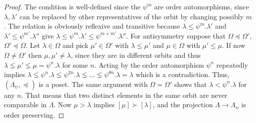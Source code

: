 \documentclass[a4paper,11pt]{amsart}
\numberwithin{equation}{subsection}
\theoremstyle{definition}
\theoremstyle{theorem}
\theoremstyle{remark}
\begin{document}
\begin{proof}
The condition is well-defined since the $\psi^{m}$ are order automorphisms, since
$\lambda,\lambda'$ can be replaced by other representatives of the orbit by changing possibly $m$.
 The relation is obviously reflexive and transitive because
$\lambda\le\psi^{m}.\lambda'$ and $\lambda'\le\psi^{m'}.\lambda''$ give
$\lambda\le\psi^{m}.\lambda'\le\psi^{m+m'}.\lambda''$. For antisymmetry suppose that $\Omega\preceq\Omega'$, $\Omega'\preceq\Omega$. Let $\lambda\in\Omega$ and pick $\mu'\in\Omega'$
with $\lambda\le\mu'$ and $\mu\in\Omega$ with $\mu'\le\mu$. If now $\Omega\ne\Omega'$ then $\mu,\mu'\not=\lambda$, since they are in different orbits and thus $\lambda\lneq\mu'\lneq\mu=\psi^n.\lambda$ for some $n$. Acting by the order automorphism $\psi^{n}$
repeatedly implies $\lambda\lneq\psi^{n}.\lambda\lneq\psi^{2n}.\lambda\lneq\dots\lneq\psi^{\theta n}.\lambda=\lambda$ which is a contradiction.
Thus, $(\Lambda_\psi,\preceq)$ is a poset. The same argument with
$\Omega=\Omega'$ shows that $\lambda<\psi^{n}.\lambda$ for any $n$. That means that
two distinct elements in the same orbit are never comparable in $\Lambda$.
Now $\mu>\lambda$ implies $[\mu]\succ[\lambda]$, and the projection
$\Lambda\to\Lambda_\psi$ is order preserving.
\end{proof}
\end{document}
